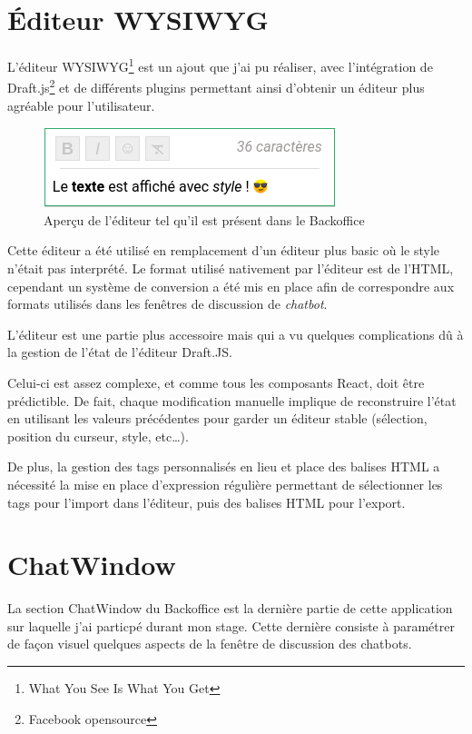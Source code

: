 \documentclass[12pt,a4paper,oneside]{scrreprt}
\begin{document}
\section{Éditeur WYSIWYG}

L'éditeur WYSIWYG\footnote{What You See Is What You Get} est un ajout que j'ai pu réaliser, avec l'intégration de Draft.js\footnote{Facebook opensource} et de différents plugins permettant ainsi d'obtenir un éditeur plus agréable pour l'utilisateur.

\begin{figure}[!ht]
	\centering
	\includegraphics[scale=0.75]{pictures/wysiwyg.png}
	\caption{Aperçu de l'éditeur tel qu'il est présent dans le Backoffice}
\end{figure}

Cette éditeur a été utilisé en remplacement d'un éditeur plus basic où le style n'était pas interprété. Le format utilisé nativement par l'éditeur est de l'HTML, cependant un système de conversion a été mis en place afin de correspondre aux formats utilisés dans les fenêtres de discussion de \textit{chatbot}.

\begin{info}
	L'éditeur est une partie plus accessoire mais qui a vu quelques complications dû à la gestion de l'état de l'éditeur Draft.JS.

	Celui-ci est assez complexe, et comme tous les composants React, doit être prédictible. De fait, chaque modification manuelle implique de reconstruire l'état en utilisant les valeurs précédentes pour garder un éditeur stable (sélection, position du curseur, style, etc\dots).

	De plus, la gestion des tags personnalisés en lieu et place des balises HTML a nécessité la mise en place d'expression régulière permettant de sélectionner les tags pour l'import dans l'éditeur, puis des balises HTML pour l'export.
\end{info}

\section{ChatWindow}

La section ChatWindow du Backoffice est la dernière partie de cette application sur laquelle j'ai particpé durant mon stage. Cette dernière consiste à paramétrer de façon visuel quelques aspects de la fenêtre de discussion des chatbots.
\end{document}
